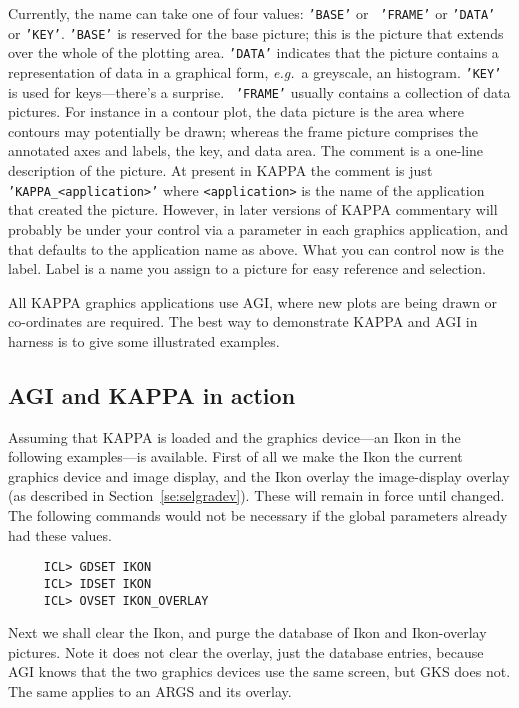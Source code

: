 Currently, the name can take one of four values: {\tt 'BASE'} or {\tt
'FRAME'} or {\tt 'DATA'} or {\tt 'KEY'}. {\tt 'BASE'} is reserved for
the base picture; this is the picture that extends over the whole of the
plotting area. {\tt 'DATA'} indicates that the picture contains a
representation of data in a graphical form, {\it e.g.}\ a greyscale, an
histogram. {\tt 'KEY'} is used for keys---there's a surprise. {\tt
'FRAME'} usually contains a collection of data pictures. For instance in
a contour plot, the data picture is the area where contours may
potentially be drawn; whereas the frame picture comprises the annotated
axes and labels, the key, and data area. The comment is a one-line
description of the picture. At present in {\small KAPPA} the comment is
just {\tt 'KAPPA\_<application>'} where {\tt <application>} is the name
of the application that created the picture. However, in later versions
of {\small KAPPA} commentary will probably be under your control via a
parameter in each graphics application, and that defaults to the
application name as above.  What you can control now is the label. Label
is a name you assign to a picture for easy reference and selection.

All {\small KAPPA} graphics applications use AGI, where new plots are
being drawn or co-ordinates are required. The best way to demonstrate
{\small KAPPA} and AGI in harness is to give some illustrated examples.

\subsection{AGI and KAPPA in action}
Assuming that {\small KAPPA} is loaded and the graphics
device---an Ikon in the following examples---is available.
First of all we make the Ikon the current graphics device and image
display, and the Ikon overlay the image-display overlay (as described
in Section~\ref{se:selgradev}). These will remain in force until changed.
The following commands would not be necessary if the global parameters
already had these values.

\small
\begin{verbatim}
     ICL> GDSET IKON
     ICL> IDSET IKON
     ICL> OVSET IKON_OVERLAY
\end{verbatim}
\normalsize
Next we shall clear the Ikon, and purge the database of Ikon and
Ikon-overlay pictures.  Note it does not clear the overlay, just the
database entries, because AGI knows that the two graphics devices use
the same screen, but GKS does not.  The same applies to an ARGS and its
overlay.

